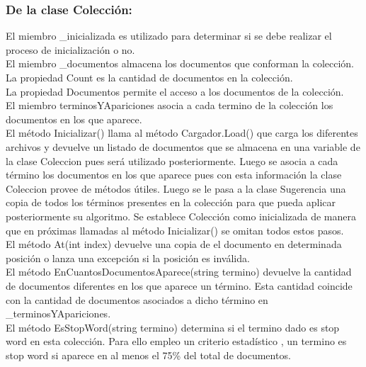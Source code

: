 \documentclass{article}
\begin{document}
\subsubsection{De la clase Colección:}
El miembro \_inicializada es utilizado para determinar si se debe realizar el proceso de inicialización o no.\\
El miembro \_documentos almacena los documentos que conforman la colección.\\
La propiedad Count es la cantidad de documentos en la colección.\\
La propiedad Documentos permite el acceso a los documentos de la colección.\\
El miembro terminosYApariciones asocia a cada termino de la colección los documentos en los que aparece.\\
El método Inicializar() llama al método Cargador.Load() que carga los diferentes archivos y devuelve un listado de documentos que se almacena en una variable de la clase Coleccion pues será utilizado posteriormente. Luego se asocia a cada término los documentos en los que aparece pues con esta información la clase Coleccion provee de métodos útiles. Luego se le pasa a la clase Sugerencia una copia de todos los términos presentes en la colección para que pueda aplicar posteriormente su algoritmo. Se establece Colección como inicializada de manera que en próximas llamadas al método Inicializar() se omitan todos estos pasos.\\
El método At(int index) devuelve una copia de el documento en determinada posición o lanza una excepción si la posición es inválida.\\
El método EnCuantosDocumentosAparece(string termino) devuelve la cantidad de documentos diferentes en los que aparece un término. Esta cantidad coincide con la cantidad de documentos asociados a dicho término en \_terminosYApariciones.\\
El método EsStopWord(string termino) determina si el termino dado es stop word en esta colección. Para ello empleo un criterio estadístico , un termino es stop word si aparece en al menos el 75\% del total de documentos.\\
\end{document}
